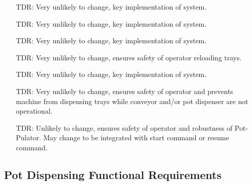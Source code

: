 \documentclass[12pt]{article}
\newcounter{tdreqnum} %
\newcounter{reqnum} %
\newcounter{lctdreqnum} %
\begin{document}
\noindent \begin{itemize}

\item[TDR\refstepcounter{lctdreqnum}\thelctdreqnum\label{LC_meaningfulLabel0}:] {Very unlikely to change,
    key implementation of system.}

\item[TDR\refstepcounter{lctdreqnum}\thelctdreqnum\label{LC_meaningfulLabel1}:] {Very unlikely to change,
    key implementation of system.}

\item[TDR\refstepcounter{lctdreqnum}\thelctdreqnum\label{LC_meaningfulLabel2}:] {Very unlikely to change,
    key implementation of system.}

\item[TDR\refstepcounter{lctdreqnum}\thelctdreqnum\label{LC_meaningfulLabel3}:] {Very unlikely to change,
    ensures safety of operator reloading trays.}

\item[TDR\refstepcounter{lctdreqnum}\thelctdreqnum\label{LC_meaningfulLabel4}:] {Very unlikely to change,
    key implementation of system.}

\item[TDR\refstepcounter{lctdreqnum}\thelctdreqnum\label{LC_meaningfulLabel5}:] {Very unlikely to change,
    ensures safety of operator and prevents machine from dispensing trays while conveyor and/or pot dispenser
    are not operational.}

\item[TDR\refstepcounter{lctdreqnum}\thelctdreqnum\label{LC_meaningfulLabel6}:] {Unlikely to change,
    ensures safety of operator and robustness of Pot-Pulator. May change to be integrated with start
    command or resume command.}

\end{itemize}

\subsection{Pot Dispensing Functional Requirements}
\end{document}
